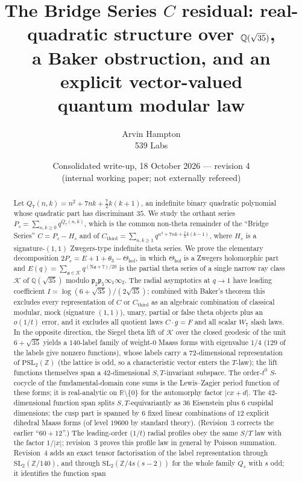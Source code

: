 \documentclass[11pt]{article}
\title{The Bridge Series $C$ residual: real-quadratic structure over $\Q(\sqrt{35})$,\\
a Baker obstruction, and an explicit vector-valued\\ quantum modular law}
\author{Arvin Hampton\\ \small 539 Labs}
\date{Consolidated write-up, 18 October 2026 --- revision 4\\ \small (internal working paper; not externally refereed)}
\theoremstyle{definition}
\newcommand{\Q}{\mathbb{Q}}
\newcommand{\Z}{\mathbb{Z}}
\newcommand{\R}{\mathbb{R}}
\newcommand{\K}{\mathcal{K}}
\newcommand{\fp}{\mathfrak{p}}
\newcommand{\fa}{\mathfrak{a}}
\newcommand{\Thol}{\Theta_{\mathrm{hol}}}
\newcommand{\Cthird}{C_{\mathrm{third}}}
\newcommand{\Nm}{\mathrm{N}}
\begin{document}
\maketitle

\begin{abstract}
Let $Q_7(n,k)=n^2+7nk+\tfrac72 k(k+1)$, an indefinite binary quadratic polynomial whose
quadratic part has discriminant $35$. We study the orthant series
$P_s=\sum_{n,k\ge 0}q^{Q_7(n,k)}$, which is the common non-theta remainder of the
``Bridge Series'' $C=P_s-H_s$ and of $\Cthird=\sum_{n,k\ge1}q^{n^2+7nk+\frac72k(k-1)}$,
where $H_s$ is a signature-$(1,1)$ Zwegers-type indefinite theta series.
We prove the elementary decomposition $2P_s=E+1+\theta_3-\Thol$, in which
$\Thol$ is a Zwegers holomorphic part and $E(q)=\sum_{\fa\in\K}q^{(\Nm\fa+7)/20}$ is the
partial theta series of a single narrow ray class $\K$ of $\Q(\sqrt{35})$ modulo $\fp_2\fp_5\infty_1\infty_2$.
The radial asymptotics at $q\to1$ have leading coefficient
$I=\log(6+\sqrt{35})/(2\sqrt{35})$; combined with Baker's theorem this excludes every
representation of $C$ or $\Cthird$ as an algebraic combination of classical modular, mock
(signature $(1,1)$), unary, partial or false theta objects plus an $o(1/t)$ error, and it excludes
all quotient laws $C\cdot g=F$ and all scalar $W_7$ slash laws. In the opposite direction,
the Siegel theta lift of $\K$ over the closed geodesic of the unit $6+\sqrt{35}$ yields a
$140$-label family of weight-$0$ Maass forms with eigenvalue $1/4$ ($129$ of the labels give nonzero functions), whose labels carry a $72$-dimensional
representation of $\mathrm{PSL}_2(\Z)$ (the lattice is odd, so a characteristic vector enters the $T$-law); the lift functions themselves span a
$42$-dimensional $S,T$-invariant subspace.
The order-$t^0$ $S$-cocycle of the fundamental-domain cone sums is the Lewis--Zagier period
function of these forms; it is real-analytic on $\R\setminus\{0\}$ for the automorphy factor
$|cx+d|$. The $42$-dimensional function span splits $S,T$-equivariantly as $36$ Eisenstein plus $6$ cuspidal dimensions; the cusp part is
spanned by $6$ fixed linear combinations of $12$ explicit dihedral Maass forms (of level $19600$ by standard theory). (Revision~3 corrects the
earlier ``$60+12$''.) The leading-order ($1/t$) radial profiles obey the same $S/T$ law with the factor $1/|x|$; revision~3 proves this
profile law in general by Poisson summation. Revision~4 adds an exact tensor factorisation of the label representation through
$\mathrm{SL}_2(\Z/140)$, and through $\mathrm{SL}_2(\Z/4s(s-2))$ for the whole family $Q_s$ with $s$ odd; it identifies the function span

\end{abstract}
\end{document}
